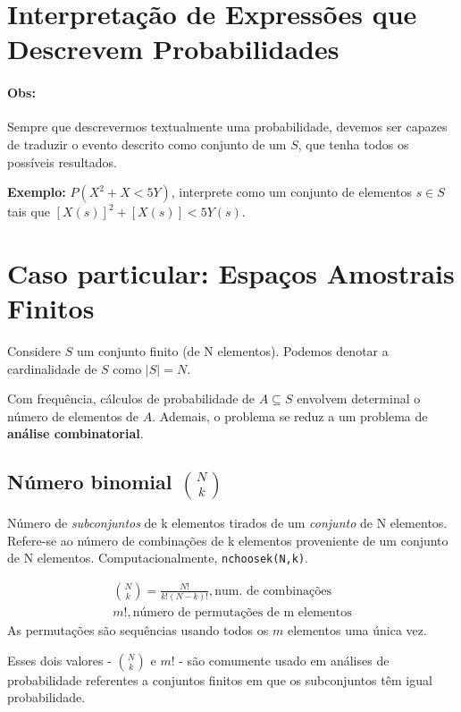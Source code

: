 \documentclass{article}
\renewcommand\bf[1]{\textbf{#1}}
\renewcommand\it[1]{\textit{#1}}
\begin{document}
\setlength{\abovedisplayskip}{12pt}
\setlength{\belowdisplayskip}{12pt}
\setlength{\abovedisplayshortskip}{0pt}
\setlength{\belowdisplayshortskip}{0pt}
\setlength{\jot}{0em}

\section{Interpretação de Expressões que Descrevem Probabilidades}
\paragraph{Obs:} Sempre que descrevermos textualmente uma probabilidade, devemos ser capazes de
traduzir o evento descrito como conjunto de um $S$, que tenha todos os possíveis resultados.

\bf{Exemplo:} $P(X^2 + X < 5 Y)$, interprete como um conjunto de elementos $s \in S$ tais que
$[X(s)]^2 + [X(s)] < 5 Y(s)$.

\section{Caso particular: Espaços Amostrais Finitos}
Considere $S$ um conjunto finito (de N elementos). Podemos denotar a cardinalidade de $S$ como $|S|
= N$.

Com frequência, cálculos de probabilidade de $A \subseteq S$ envolvem determinal o número de
elementos de $A$. Ademais, o problema se reduz a um problema de \bf{análise combinatorial}.

\subsection{Número binomial ${N \choose k}$}
Número de \it{subconjuntos} de k elementos tirados de um \it{conjunto} de N elementos. Refere-se ao
número de combinações de k elementos proveniente de um conjunto de N elementos. Computacionalmente,
\texttt{nchoosek(N,k)}.

\begin{align*}
    {N \choose k} = \frac{N!}{k!(N-k)!}, \text{num. de combinações} \\[0.5em]
    m!, \text{número de permutações de m elementos}
\end{align*}
As permutações são sequências usando todos os $m$ elementos uma única vez.

Esses dois valores - ${N \choose k}$ e $m!$ - são comumente usado em análises de probabilidade
referentes a conjuntos finitos em que os subconjuntos têm igual probabilidade.
\end{document}
